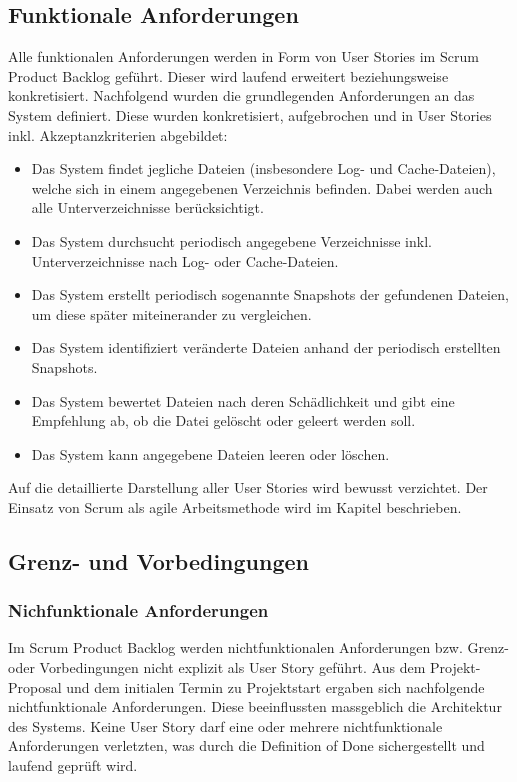 \documentclass[a4paper,12pt]{report}
\begin{document}
    \subsection{Funktionale Anforderungen}\label{subsec:funktionale-anforderungen}

    Alle funktionalen Anforderungen werden in Form von User Stories im Scrum Product Backlog geführt.
    Dieser wird laufend erweitert beziehungsweise konkretisiert.
    Nachfolgend wurden die grundlegenden Anforderungen an das System definiert.
    Diese wurden konkretisiert, aufgebrochen und in User Stories inkl. Akzeptanzkriterien abgebildet:
    \begin{itemize}
        \item Das System findet jegliche Dateien (insbesondere Log- und Cache-Dateien), welche sich in einem angegebenen Verzeichnis befinden.
        Dabei werden auch alle Unterverzeichnisse berücksichtigt.
        \item Das System durchsucht periodisch angegebene Verzeichnisse inkl.
        Unterverzeichnisse nach Log- oder Cache-Dateien.
        \item Das System erstellt periodisch sogenannte Snapshots der gefundenen Dateien, um diese später miteinerander zu vergleichen.
        \item Das System identifiziert veränderte Dateien anhand der periodisch erstellten Snapshots.
        \item Das System bewertet Dateien nach deren Schädlichkeit und gibt eine Empfehlung ab, ob die Datei gelöscht oder geleert werden soll.
        \item Das System kann angegebene Dateien leeren oder löschen.
    \end{itemize}
    Auf die detaillierte Darstellung aller User Stories wird bewusst verzichtet.
    Der Einsatz von Scrum als agile Arbeitsmethode wird im Kapitel  beschrieben.

    \newpage

    \subsection{Grenz- und Vorbedingungen}

    \subsubsection{Nichfunktionale Anforderungen}\label{subsubsec:nichtfunktionale-anforderungen}
    Im Scrum Product Backlog werden nichtfunktionalen Anforderungen bzw.
    Grenz- oder Vorbedingungen nicht explizit als User Story geführt.
    Aus dem Projekt-Proposal und dem initialen Termin zu Projektstart ergaben sich nachfolgende nichtfunktionale Anforderungen.
    Diese beeinflussten massgeblich die Architektur des Systems.
    Keine User Story darf eine oder mehrere nichtfunktionale Anforderungen verletzten, was durch die Definition of Done sichergestellt und laufend geprüft wird.
\end{document}
